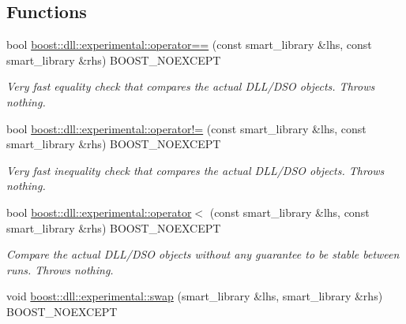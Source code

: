 \subsection*{Functions}
\begin{DoxyCompactItemize}
\item 
bool \hyperlink{a00738_a28f2c872bb195c01abac14c422574200}{boost\+::dll\+::experimental\+::operator==} (const smart\+\_\+library \&lhs, const smart\+\_\+library \&rhs) B\+O\+O\+S\+T\+\_\+\+N\+O\+E\+X\+C\+E\+PT\hypertarget{a00738_a28f2c872bb195c01abac14c422574200}{}\label{a00738_a28f2c872bb195c01abac14c422574200}

\begin{DoxyCompactList}\small\item\em Very fast equality check that compares the actual D\+L\+L/\+D\+SO objects. Throws nothing. \end{DoxyCompactList}\item 
bool \hyperlink{a00738_ae0e073cbea11e17ecd11379d09932d5a}{boost\+::dll\+::experimental\+::operator!=} (const smart\+\_\+library \&lhs, const smart\+\_\+library \&rhs) B\+O\+O\+S\+T\+\_\+\+N\+O\+E\+X\+C\+E\+PT\hypertarget{a00738_ae0e073cbea11e17ecd11379d09932d5a}{}\label{a00738_ae0e073cbea11e17ecd11379d09932d5a}

\begin{DoxyCompactList}\small\item\em Very fast inequality check that compares the actual D\+L\+L/\+D\+SO objects. Throws nothing. \end{DoxyCompactList}\item 
bool \hyperlink{a00738_a40d1a66c634ab4786294da1d4a72a742}{boost\+::dll\+::experimental\+::operator$<$} (const smart\+\_\+library \&lhs, const smart\+\_\+library \&rhs) B\+O\+O\+S\+T\+\_\+\+N\+O\+E\+X\+C\+E\+PT\hypertarget{a00738_a40d1a66c634ab4786294da1d4a72a742}{}\label{a00738_a40d1a66c634ab4786294da1d4a72a742}

\begin{DoxyCompactList}\small\item\em Compare the actual D\+L\+L/\+D\+SO objects without any guarantee to be stable between runs. Throws nothing. \end{DoxyCompactList}\item 
void \hyperlink{a00738_ae367de5e0fec67022b59687adcd0c065}{boost\+::dll\+::experimental\+::swap} (smart\+\_\+library \&lhs, smart\+\_\+library \&rhs) B\+O\+O\+S\+T\+\_\+\+N\+O\+E\+X\+C\+E\+PT\hypertarget{a00738_ae367de5e0fec67022b59687adcd0c065}{}\label{a00738_ae367de5e0fec67022b59687adcd0c065}


\end{DoxyCompactItemize}
